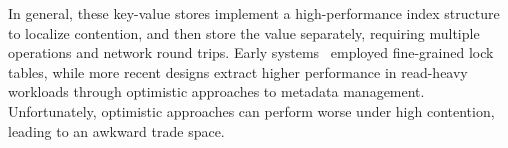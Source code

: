 In general, these key-value stores implement a high-performance index
structure to localize contention, and then store the value separately,
requiring multiple operations and network round trips.  Early
systems~\cite{sherman} employed fine-grained lock tables, while more
recent designs extract higher performance in read-heavy workloads
through optimistic approaches to metadata management.  Unfortunately,
optimistic approaches can perform worse under high contention,
leading to an awkward trade space.





